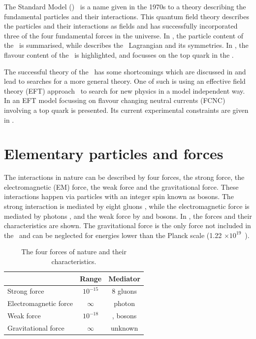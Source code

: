 The Standard Model (\SM)~\cite{Peskin:257493} 
is a name given in the 1970s to a theory describing the fundamental particles and their interactions. This quantum field theory describes the particles and their interactions as fields and has successfully incorporated three of the four fundamental forces in the universe. In , the particle content of the \SM\ is summarised, while  describes  the \SM\ Lagrangian and its symmetries. In , the flavour content of the \SM\ is highlighted, and  focusses on the top quark in the \SM. 

The successful theory of the \SM\ has some shortcomings which are discussed in  and lead to searches for a more general theory. One of such  is using  an effective field theory (EFT) approach~\cite{Burgess:2007pt}  to search for new physics in a model independent way. In  an EFT model focussing on flavour changing neutral currents (FCNC) involving a top quark is presented. Its current experimental constraints are given in .



\section{Elementary particles and forces}
\label{sec:SMcontent}
The interactions in nature can be described by four forces, the strong force, the electromagnetic (EM) force, the weak force and the gravitational force. These interactions happen via particles with an integer spin known as bosons. The strong interaction is mediated by eight gluons \Pgluon, while the electromagnetic force is mediated by photons \Pphoton, and the weak force by \PZ and \PWpm bosons. In , the forces and their characteristics are shown. The gravitational force is the only force not included in the \SM\ and can be neglected for energies lower than the Planck scale (1.22 $\times 10^{19}$~\GeV).
\begin{table}[htbp]
	\centering
	\caption{The four forces of nature and their characteristics.}
	\begin{tabular}{lcc}
		\toprule
		& Range & Mediator \\ 
		\midrule
		Strong force & $10^{-15}$ \m & 8 gluons  \\ 
	
		Electromagnetic force & $\infty$ & photon  \\ 
		 
		Weak force & $10^{-18}$ \m & \PWpm, \PZ bosons \\ 
		
		Gravitational force & $\infty$ & unknown \\ 
		\bottomrule
	\end{tabular} 
	\label{tab:forces}
\end{table}

